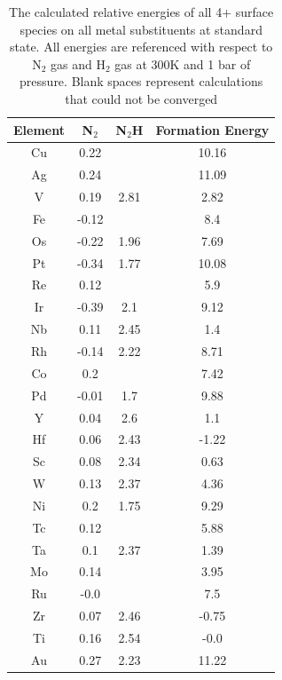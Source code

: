 \begin{table}
\begin{center}
\begin{tabular}{| c | c | c | c |}
\hline
Element & N$_2$ & N$_2$H & Formation Energy \\
\hline
Cu & 0.22 &  & 10.16 \\
Ag & 0.24 &  & 11.09 \\
V & 0.19 & 2.81 & 2.82 \\
Fe & -0.12 &  & 8.4 \\
Os & -0.22 & 1.96 & 7.69 \\
Pt & -0.34 & 1.77 & 10.08 \\
Re & 0.12 &  & 5.9 \\
Ir & -0.39 & 2.1 & 9.12 \\
Nb & 0.11 & 2.45 & 1.4 \\
Rh & -0.14 & 2.22 & 8.71 \\
Co & 0.2 &  & 7.42 \\
Pd & -0.01 & 1.7 & 9.88 \\
Y & 0.04 & 2.6 & 1.1 \\
Hf & 0.06 & 2.43 & -1.22 \\
Sc & 0.08 & 2.34 & 0.63 \\
W & 0.13 & 2.37 & 4.36 \\
Ni & 0.2 & 1.75 & 9.29 \\
Tc & 0.12 &  & 5.88 \\
Ta & 0.1 & 2.37 & 1.39 \\
Mo & 0.14 &  & 3.95 \\
Ru & -0.0 &  & 7.5 \\
Zr & 0.07 & 2.46 & -0.75 \\
Ti & 0.16 & 2.54 & -0.0 \\
Au & 0.27 & 2.23 & 11.22 \\
\hline
\end{tabular}
\end{center}
\label{table:4+_energies}
\caption{The calculated relative energies of all 4+ surface species on all metal substituents at standard state. All energies are referenced with respect to N$_2$ gas and H$_2$ gas at 300K and 1 bar of pressure. Blank spaces represent calculations that could not be converged}
\end{table}

